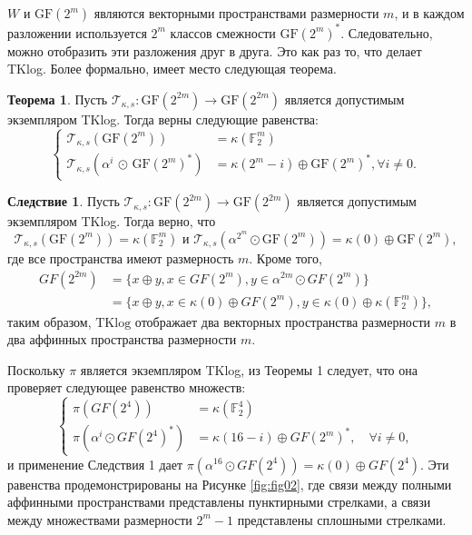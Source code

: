 \(W\) и \(\mathrm{GF}(2^m)\) являются векторными пространствами размерности \(m\), и в каждом разложении используется \(2^m\) классов смежности \(\mathrm{GF}(2^m)^*\). Следовательно, можно отобразить эти разложения друг в друга. Это как раз то, что делает TKlog. Более формально, имеет место следующая теорема.

\textbf{Теорема 1}. Пусть \(\mathscr{T}_{\kappa,s} : \mathrm{GF}(2^{2m}) \to \mathrm{GF}(2^{2m})\) является допустимым экземпляром TKlog. Тогда верны следующие равенства:
\[
\begin{cases}
  \mathscr{T}_{\kappa,s}(\mathrm{GF}(2^m)) & = \kappa(\mathbb{F}_2^m) \\
  \mathscr{T}_{\kappa,s}(\alpha^i \, \odot \, \mathrm{GF}(2^m)^*) & = \kappa(2^m - i) \oplus \mathrm{GF}(2^m)^*, \forall i \neq 0.
\end{cases}
\]

\textbf{Следствие 1}. Пусть \(\mathscr{T}_{\kappa,s} : \mathrm{GF}(2^{2m}) \to \mathrm{GF}(2^{2m})\) является допустимым экземпляром TKlog. Тогда верно, что
\[
  \mathscr{T}_{\kappa,s}(\mathrm{GF}(2^m)) = \kappa(\mathbb{F}_2^m) \text{ и } \mathscr{T}_{\kappa,s}(\alpha^{2^m} \odot \mathrm{GF}(2^m)) = \kappa(0) \oplus \mathrm{GF}(2^m),
\] где все пространства имеют размерность \( m \). Кроме того,
\begin{align*}
GF(2^{2m}) & = \{ x \oplus y, x \in GF(2^m), y \in \alpha^{2m} \odot GF(2^m) \} \\
& = \{ x \oplus y, x \in \kappa(0) \oplus GF(2^m), y \in \kappa(0) \oplus \kappa (\mathbb{F}_{2}^{m}) \},
\end{align*}
таким образом, \( \text{TKlog} \) отображает два векторных пространства размерности \( m \) в два аффинных пространства размерности \( m \).

Поскольку \( \pi \) является экземпляром TKlog, из Теоремы 1 следует, что она проверяет следующее равенство множеств:
\[
  \begin{cases}
\pi\left( GF(2^4) \right) & = \kappa(\mathbb{F}_{2}^{4}) \\
\pi\left( \alpha^i \odot GF(2^4)^{\ast} \right) & = \kappa(16 - i) \oplus GF(2^m)^{\ast}, \quad \forall i \neq 0,
  \end{cases}
\]
и применение Следствия 1 дает \(\pi(\alpha^{16} \odot GF(2^4)) = \kappa(0) \oplus GF(2^4)\). Эти равенства продемонстрированы на Рисунке \eqref{fig:fig02}, где связи между полными аффинными пространствами представлены пунктирными стрелками, а связи между множествами размерности \(2^m - 1\) представлены сплошными стрелками.

